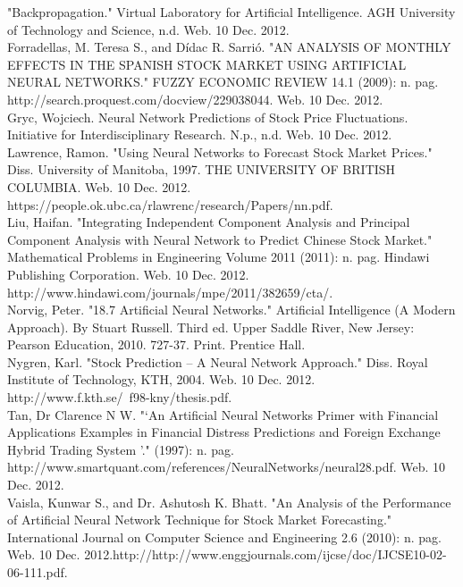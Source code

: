 \documentclass[a4paper,11pt]{article}
\begin{document}
"Backpropagation." Virtual Laboratory for Artificial Intelligence. AGH University of Technology and Science, n.d. Web. 10 Dec. 2012.\\


Forradellas, M. Teresa S., and Dídac R. Sarrió. "AN ANALYSIS OF MONTHLY EFFECTS IN THE SPANISH STOCK MARKET USING ARTIFICIAL NEURAL NETWORKS." FUZZY ECONOMIC REVIEW 14.1 (2009): n. pag.\\ http://search.proquest.com/docview/229038044. Web. 10 Dec. 2012.\\

Gryc, Wojciech. Neural Network Predictions of Stock Price Fluctuations. Initiative for Interdisciplinary Research. N.p., n.d. Web. 10 Dec. 2012.\\

Lawrence, Ramon. "Using Neural Networks to Forecast Stock Market Prices." Diss. University of Manitoba, 1997. THE UNIVERSITY OF BRITISH COLUMBIA. Web. 10 Dec. 2012. https://people.ok.ubc.ca/rlawrenc/research/Papers/nn.pdf.\\

Liu, Haifan. "Integrating Independent Component Analysis and Principal Component Analysis with Neural Network to Predict Chinese Stock Market." Mathematical Problems in Engineering Volume 2011 (2011): n. pag. Hindawi Publishing Corporation. Web. 10 Dec. 2012. http://www.hindawi.com/journals/mpe/2011/382659/cta/.\\

Norvig, Peter. "18.7 Artificial Neural Networks." Artificial Intelligence (A Modern Approach). By Stuart Russell. Third ed. Upper Saddle River, New Jersey: Pearson Education, 2010. 727-37. Print. Prentice Hall.\\

Nygren, Karl. "Stock Prediction – A Neural Network Approach." Diss. Royal Institute of Technology, KTH, 2004. Web. 10 Dec. 2012. http://www.f.kth.se/~f98-kny/thesis.pdf.\\

Tan, Dr Clarence N W. "‘An Artificial Neural Networks Primer with Financial Applications Examples in Financial Distress Predictions and Foreign Exchange Hybrid Trading System ’." (1997): n. pag.\\ http://www.smartquant.com/references/NeuralNetworks/neural28.pdf. Web. 10 Dec. 2012. \\

Vaisla, Kunwar S., and Dr. Ashutosh K. Bhatt. "An Analysis of the Performance of Artificial Neural Network Technique for Stock Market Forecasting." International Journal on Computer Science and Engineering 2.6 (2010): n. pag. Web. 10 Dec. 2012.http://http://www.enggjournals.com/ijcse/doc/IJCSE10-02-06-111.pdf.\\
\end{document}
